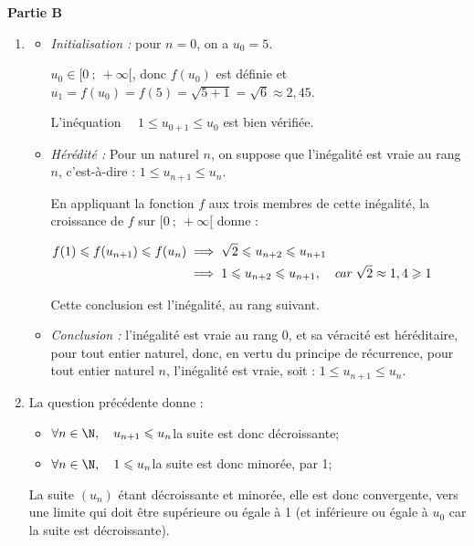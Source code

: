 \medskip
\textbf{Partie B}

\medskip

\begin{enumerate}
	\item \begin{itemize}
		\item \emph{Initialisation :} pour  $n= 0$, on a $u_0 = 5$.

$u_0 \in [0~;~+\infty[$, donc $f(u_0)$ est définie et $u_1 = f(u_0) = f(5) = \sqrt{5+1} = \sqrt{6} \approx 2,45$.

L'inéquation $ \quad 1 \leqslant u_{0+1} \leqslant u_0$ \quad est bien vérifiée.

		\item \emph{Hérédité :} Pour un naturel $n$, on suppose que l'inégalité est vraie au rang $n$, c'est-à-dire : \quad $1 \leqslant u_{n+1} \leqslant u_n$.

En appliquant la fonction $f$ aux trois membres de cette inégalité, la croissance de $f$ sur $[0~;~+\infty[$ donne :

$\aligned f(1 ) \leqslant f(u_{n+1})\leqslant f(u_n) &\implies \sqrt{2} \leqslant u_{n+2} \leqslant u_{n+1}\\
&\implies 1 \leqslant u_{n+2} \leqslant u_{n+1},\quad \emph{car } \sqrt{2} \approx 1,4 \geqslant 1\endaligned$

Cette conclusion est l'inégalité, au rang suivant.

	\item \emph{Conclusion :} l'inégalité est vraie au rang 0, et sa véracité est héréditaire, pour tout entier naturel, donc, en vertu du principe de récurrence, pour tout entier naturel $n$, l'inégalité est vraie, soit : \quad $1 \leqslant u_{n+1} \leqslant u_{n}$.
		\end{itemize}

	\item La question précédente donne :
\begin{itemize}[left=5mm]
		\item $\forall n\in \N, \quad u_{n+1} \leqslant u_n$\quad la suite est donc décroissante;
		\item $\forall n\in \N, \quad 1 \leqslant u_n$\quad la suite est donc minorée, par 1;
	\end{itemize}

La suite $\left(u_n\right)$ étant décroissante et minorée, elle est donc convergente, vers une limite qui doit être supérieure ou égale à 1 (et inférieure ou égale à $u_0$ car la suite est décroissante).


\end{enumerate}
